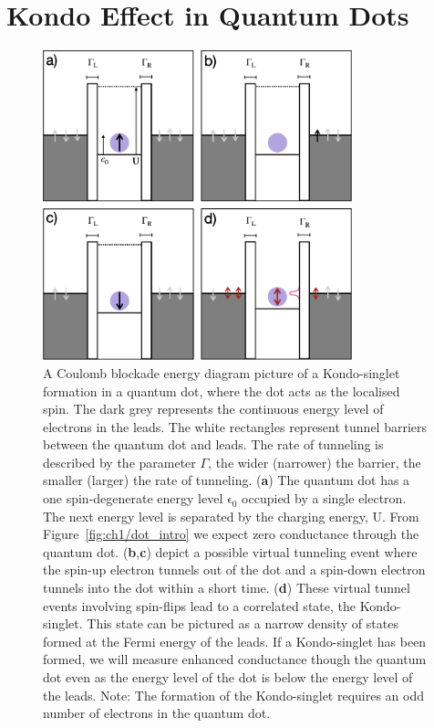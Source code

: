 \afterpage{\clearpage}
\section{Kondo Effect in Quantum Dots}

\begin{figure}[!hbt]
  \begin{center}
    \includegraphics[width=0.8\textwidth]{figures/ch2/crop_PosterFiguresMaster.007.png}
    \caption[Kondo effect in a quantum dot: Coulomb blockade energy diagrams]{\label{fig:ch2/kondo_dot_diagram} 
    A Coulomb blockade energy diagram picture of a Kondo-singlet formation in a quantum dot, where the dot acts as the localised spin. The dark grey represents the continuous energy level of electrons in the leads. The white rectangles represent tunnel barriers between the quantum dot and leads. The rate of tunneling is described by the parameter $\Gamma$, the wider (narrower) the barrier, the smaller (larger) the rate of tunneling. (\textbf{a}) The quantum dot has a one spin-degenerate energy level $\mathrm{\epsilon_0}$ occupied by a single electron. The next energy level is separated by the charging energy, $\mathrm{U}$. From Figure~\ref{fig:ch1/dot_intro} we expect zero conductance through the quantum dot. (\textbf{b},\textbf{c}) depict a possible virtual tunneling event where the spin-up electron tunnels out of the dot and a spin-down electron tunnels into the dot within a short time. (\textbf{d}) These virtual tunnel events involving spin-flips lead to a correlated state, the Kondo-singlet. This state can be pictured as a narrow density of states formed at the Fermi energy of the leads. If a Kondo-singlet has been formed, we will measure enhanced conductance though the quantum dot even as the energy level of the dot is below the energy level of the leads. Note: The formation of the Kondo-singlet requires an odd number of electrons in the quantum dot.
      }
  \end{center}
\end{figure}


